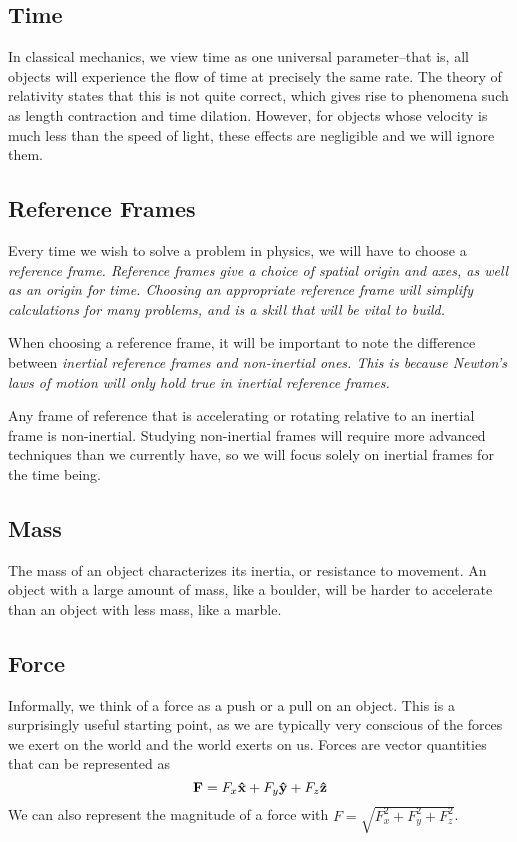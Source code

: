 \subsection*{Time}
In classical mechanics, we view time as one universal parameter--that is, all objects will experience the flow of time at precisely the same rate. The theory of relativity states that this is not quite correct, which gives rise to phenomena such as length contraction and time dilation. However, for objects whose velocity is much less than the speed of light, these effects are negligible and we will ignore them.

\subsection*{Reference Frames}
Every time we wish to solve a problem in physics, we will have to choose a \it{reference frame}. Reference frames give a choice of spatial origin and axes, as well as an origin for time. Choosing an appropriate reference frame will simplify calculations for many problems, and is a skill that will be vital to build.

When choosing a reference frame, it will be important to note the difference between \it{inertial} reference frames and non-inertial ones. This is because Newton's laws of motion will only hold true in inertial reference frames. 

Any frame of reference that is accelerating or rotating relative to an inertial frame is non-inertial. Studying non-inertial frames will require more advanced techniques than we currently have, so we will focus solely on inertial frames for the time being.

\subsection*{Mass}
The mass of an object characterizes its inertia, or resistance to movement. An object with a large amount of mass, like a boulder, will be harder to accelerate than an object with less mass, like a marble.

\subsection*{Force}
Informally, we think of a force as a push or a pull on an object. This is a surprisingly useful starting point, as we are typically very conscious of the forces we exert on the world and the world exerts on us. Forces are vector quantities that can be represented as
\[ \mathbf{F} = F_x\mathbf{\hat{x}} + F_y\mathbf{\hat{y}} + F_z\mathbf{\hat{z}} \]
We can also represent the magnitude of a force with $F = \sqrt{F_x^2 + F_y^2 + F_z^2}$. 

